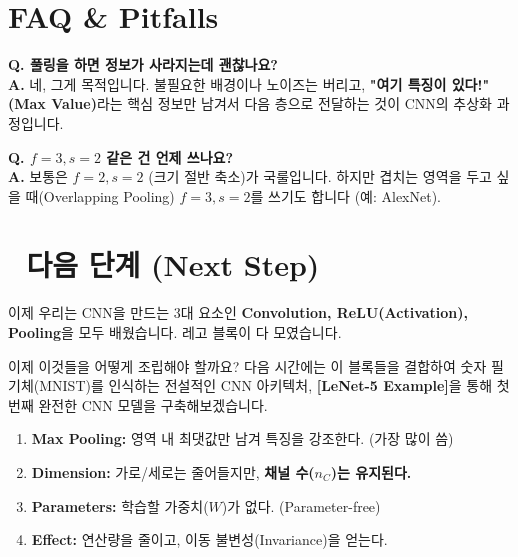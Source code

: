 \documentclass[11pt,a4paper]{book}
\theoremstyle{definition}
\begin{document}
\section{FAQ \& Pitfalls}

\textbf{Q. 풀링을 하면 정보가 사라지는데 괜찮나요?} \\
\textbf{A.} 네, 그게 목적입니다. 불필요한 배경이나 노이즈는 버리고, \textbf{"여기 특징이 있다!"(Max Value)}라는 핵심 정보만 남겨서 다음 층으로 전달하는 것이 CNN의 추상화 과정입니다.

\textbf{Q. $f=3, s=2$ 같은 건 언제 쓰나요?} \\
\textbf{A.} 보통은 $f=2, s=2$ (크기 절반 축소)가 국룰입니다. 하지만 겹치는 영역을 두고 싶을 때(Overlapping Pooling) $f=3, s=2$를 쓰기도 합니다 (예: AlexNet).

\section*{🔗 다음 단계 (Next Step)}
이제 우리는 CNN을 만드는 3대 요소인 \textbf{Convolution, ReLU(Activation), Pooling}을 모두 배웠습니다. 레고 블록이 다 모였습니다.

이제 이것들을 어떻게 조립해야 할까요?
다음 시간에는 이 블록들을 결합하여 숫자 필기체(MNIST)를 인식하는 전설적인 CNN 아키텍처, \textbf{[LeNet-5 Example]}을 통해 첫 번째 완전한 CNN 모델을 구축해보겠습니다.

\vspace{0.5cm}

\begin{summarybox}[title={단원 요약 (Cheat Sheet)}]
\begin{enumerate}
    \item \textbf{Max Pooling:} 영역 내 최댓값만 남겨 특징을 강조한다. (가장 많이 씀)
    \item \textbf{Dimension:} 가로/세로는 줄어들지만, \textbf{채널 수($n_C$)는 유지된다.}
    \item \textbf{Parameters:} 학습할 가중치($W$)가 없다. (Parameter-free)
    \item \textbf{Effect:} 연산량을 줄이고, 이동 불변성(Invariance)을 얻는다.
\end{enumerate}
\end{summarybox}


\end{document}
